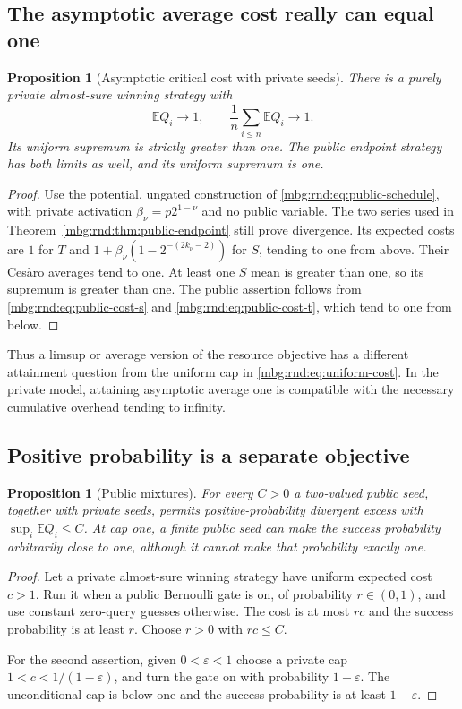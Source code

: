 \documentclass[11pt,letterpaper]{article}
\newtheorem{proposition}[theorem]{Proposition}
\theoremstyle{definition}
\newcommand{\E}{\mathbb E}
\begin{document}
\subsection{The asymptotic average cost really can equal one}

\begin{proposition}[Asymptotic critical cost with private seeds]
\label{mbg:rnd:prop:asymptotic}
There is a purely private almost-sure winning strategy with
\[
 \E Q_i\longrightarrow1,
 \qquad\frac1n\sum_{i\le n}\E Q_i\longrightarrow1.
\]
Its uniform supremum is strictly greater than one. The public endpoint
strategy has both limits as well, and its uniform supremum is one.
\end{proposition}
\begin{proof}
Use the potential, ungated construction of
\eqref{mbg:rnd:eq:public-schedule}, with private activation
$\beta_\nu=p2^{1-\nu}$ and no public variable. The two series used in
Theorem~\ref{mbg:rnd:thm:public-endpoint} still prove divergence. Its expected costs
are $1$ for $T$ and $1+\beta_\nu(1-2^{-(2k_\nu-2)})$ for $S$, tending to
one from above. Their Ces\`aro averages tend to one. At least one $S$
mean is greater than one, so its supremum is greater than one. The
public assertion follows from \eqref{mbg:rnd:eq:public-cost-s} and
\eqref{mbg:rnd:eq:public-cost-t}, which tend to one from below.
\end{proof}

Thus a limsup or average version of the resource objective has a
different attainment question from the uniform cap in
\eqref{mbg:rnd:eq:uniform-cost}. In the private model, attaining asymptotic
average one is compatible with the necessary cumulative overhead
tending to infinity.

\subsection{Positive probability is a separate objective}

\begin{proposition}[Public mixtures]
\label{mbg:rnd:prop:public-mixture}
For every $C>0$ a two-valued public seed, together with private seeds,
permits positive-probability divergent excess with
$\sup_i\E Q_i\le C$. At cap one, a finite public seed can make the
success probability arbitrarily close to one, although it cannot make
that probability exactly one.
\end{proposition}
\begin{proof}
Let a private almost-sure winning strategy have uniform expected cost
$c>1$. Run it when a public Bernoulli gate is on, of probability
$r\in(0,1)$, and use constant zero-query guesses otherwise. The cost
is at most $rc$ and the success probability is at least $r$. Choose
$r>0$ with $rc\le C$.

For the second assertion, given $0<\varepsilon<1$ choose a private cap
$1<c<1/(1-\varepsilon)$, and turn the gate on with probability
$1-\varepsilon$. The unconditional cap is below one and the success
probability is at least $1-\varepsilon$.
\end{proof}
\end{document}
